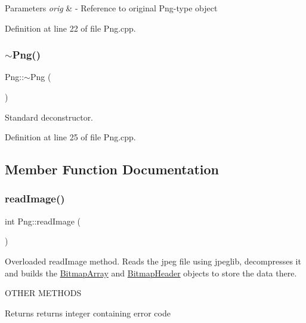 \begin{DoxyParams}{Parameters}
{\em orig} & -\/ Reference to original Png-\/type object \\
\hline
\end{DoxyParams}


Definition at line 22 of file Png.\+cpp.

\mbox{\label{classPng_ad26b67ca927b367d4bc294b07f16868d}} 
\subsubsection{\texorpdfstring{$\sim$Png()}{~Png()}}
{\footnotesize\ttfamily Png\+::$\sim$\+Png (\begin{DoxyParamCaption}{ }\end{DoxyParamCaption})\hspace{0.3cm}{\ttfamily [virtual]}}

Standard deconstructor. 

Definition at line 25 of file Png.\+cpp.



\subsection{Member Function Documentation}
\mbox{\label{classPng_aa38d2a6baa44bd0b3a932b93ee67e419}} 
\subsubsection{\texorpdfstring{readImage()}{readImage()}}
{\footnotesize\ttfamily int Png\+::read\+Image (\begin{DoxyParamCaption}{ }\end{DoxyParamCaption})\hspace{0.3cm}{\ttfamily [virtual]}}



Overloaded read\+Image method. Reads the jpeg file using jpeglib, decompresses it and builds the \mbox{\hyperlink{classBitmapArray}{Bitmap\+Array}} and \mbox{\hyperlink{classBitmapHeader}{Bitmap\+Header}} objects to store the data there. 

O\+T\+H\+ER M\+E\+T\+H\+O\+DS\begin{DoxyReturn}{Returns}
returns integer containing error code 
\end{DoxyReturn}


